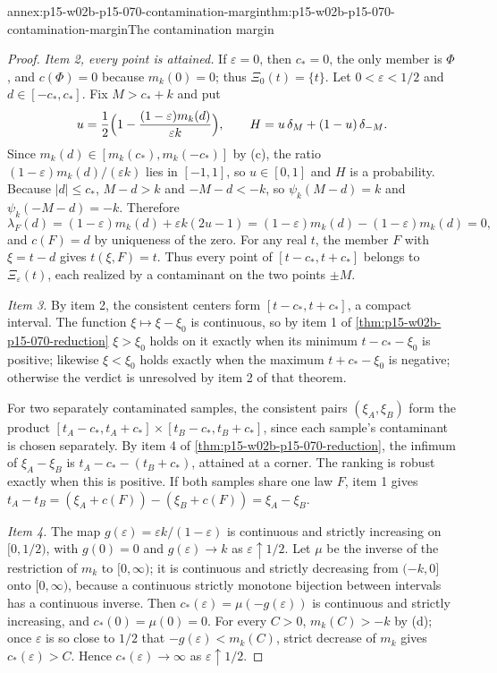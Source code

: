\begin{annexitem}{annex:p15-w02b-p15-070-contamination-margin}{thm:p15-w02b-p15-070-contamination-margin}{The contamination margin}
\begin{proof}
\emph{Item 2, every point is attained.} If \(\varepsilon=0\), then
\(c_*=0\), the only member is \(\Phi\), and \(c(\Phi)=0\) because
\(m_k(0)=0\); thus \(\Xi_0(t)=\{t\}\). Let \(0<\varepsilon<1/2\) and
\(d\in[-c_*,c_*]\). Fix \(M>c_*+k\) and put
\[
 u=\frac12\Bigl(1-\frac{(1-\varepsilon)m_k(d)}{\varepsilon k}\Bigr),
 \qquad H=u\,\delta_M+(1-u)\,\delta_{-M}.
\]
Since \(m_k(d)\in[m_k(c_*),m_k(-c_*)]\) by (c), the ratio
\((1-\varepsilon)m_k(d)/(\varepsilon k)\) lies in \([-1,1]\), so
\(u\in[0,1]\) and \(H\) is a probability. Because \(|d|\leq c_*\),
\(M-d>k\) and \(-M-d<-k\), so \(\psi_k(M-d)=k\) and
\(\psi_k(-M-d)=-k\). Therefore
\[
 \lambda_F(d)=(1-\varepsilon)m_k(d)+\varepsilon k(2u-1)
 =(1-\varepsilon)m_k(d)-(1-\varepsilon)m_k(d)=0,
\]
and \(c(F)=d\) by uniqueness of the zero. For any real \(t\), the
member \(F\) with \(\xi=t-d\) gives \(t(\xi,F)=t\). Thus every point of
\([t-c_*,t+c_*]\) belongs to \(\Xi_\varepsilon(t)\), each realized by a
contaminant on the two points \(\pm M\).

\emph{Item 3.} By item 2, the consistent centers form
\([t-c_*,t+c_*]\), a compact interval. The function
\(\xi\mapsto\xi-\xi_0\) is continuous, so by item 1 of
\cref{thm:p15-w02b-p15-070-reduction} \(\xi>\xi_0\) holds on it exactly
when its minimum \(t-c_*-\xi_0\) is positive; likewise \(\xi<\xi_0\)
holds exactly when the maximum \(t+c_*-\xi_0\) is negative; otherwise
the verdict is unresolved by item 2 of that theorem.

For two separately contaminated samples, the consistent pairs
\((\xi_A,\xi_B)\) form the product
\([t_A-c_*,t_A+c_*]\times[t_B-c_*,t_B+c_*]\), since each sample's
contaminant is chosen separately. By item 4 of
\cref{thm:p15-w02b-p15-070-reduction}, the infimum of \(\xi_A-\xi_B\) is
\(t_A-c_*-(t_B+c_*)\), attained at a corner. The ranking is robust exactly
when this is positive. If both samples share one law \(F\), item 1
gives \(t_A-t_B=(\xi_A+c(F))-(\xi_B+c(F))=\xi_A-\xi_B\).

\emph{Item 4.} The map \(g(\varepsilon)=\varepsilon k/(1-\varepsilon)\)
is continuous and strictly increasing on \([0,1/2)\), with
\(g(0)=0\) and \(g(\varepsilon)\to k\) as \(\varepsilon\uparrow1/2\).
Let \(\mu\) be the inverse of the restriction of \(m_k\) to
\([0,\infty)\); it is continuous and strictly decreasing from
\((-k,0]\) onto \([0,\infty)\), because a continuous strictly monotone
bijection between intervals has a continuous inverse. Then
\(c_*(\varepsilon)=\mu(-g(\varepsilon))\) is continuous and strictly
increasing, and \(c_*(0)=\mu(0)=0\). For every \(C>0\),
\(m_k(C)>-k\) by (d); once \(\varepsilon\) is so close to \(1/2\) that
\(-g(\varepsilon)<m_k(C)\), strict decrease of \(m_k\) gives
\(c_*(\varepsilon)>C\). Hence \(c_*(\varepsilon)\to\infty\) as
\(\varepsilon\uparrow1/2\).


\end{proof}
\end{annexitem}
